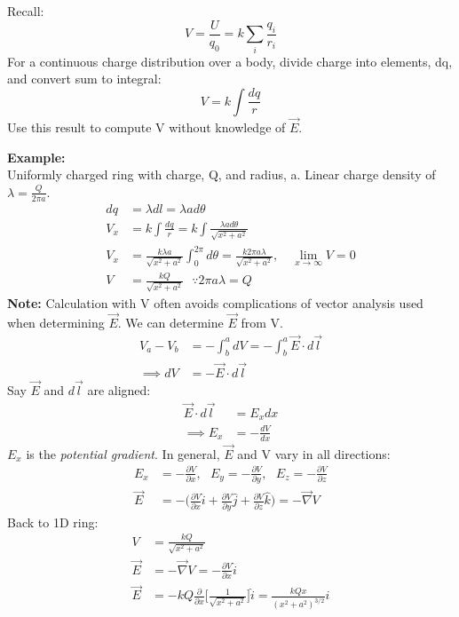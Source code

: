 \documentclass[a4paper, 11pt, normalem]{report}
\begin{document}
\chapter{}
Recall:
\begin{equation}
    V = \frac{U}{q_{0}} = k \sum_{i} \frac{q_{i}}{r_{i}}
\end{equation}
For a continuous charge distribution over a body, divide charge into elements, dq, and convert sum to integral:
\begin{equation}
    V = k \int \frac{dq}{r}
\end{equation}
Use this result to compute V without knowledge of $\vec{E}$.

\textbf{Example:}\\
Uniformly charged ring with charge, Q, and radius, a.
Linear charge density of $\lambda = \frac{Q}{2\pi a}$.
\begin{align}
    dq &= \lambda dl = \lambda a d\theta \\
    V_{x} &= k \int \frac{dq}{r} = k \int \frac{\lambda a d\theta}{\sqrt{x^{2} + a^{2}}} \\
    V_{x} &= \frac{k\lambda a}{\sqrt{x^{2} + a^{2}}} \int_{0}^{2\pi} d\theta = \frac{k2\pi a \lambda}{\sqrt{x^{2} + a^{2}}},\quad \lim_{x \to \infty} V = 0 \\
    V &= \frac{kQ}{\sqrt{x^{2} + a^{2}}} ~~~ \because 2\pi a \lambda = Q
\end{align}
\textbf{Note:} Calculation with V often avoids complications of vector analysis used when determining $\vec{E}$. We can determine $\vec{E}$ from V.
\begin{align}
    V_{a} - V_{b} &= - \int_{b}^{a} dV = - \int_{b}^{a} \vec{E} \cdot d\vec{l} \\
    \implies dV &= - \vec{E} \cdot d\vec{l}
\end{align}
Say $\vec{E}$ and $d\vec{l}$ are aligned:
\begin{align}
    \vec{E} \cdot d\vec{l} &= E_{x}dx \\
    \implies E_{x} &= - \frac{dV}{dx}
\end{align}
$E_{x}$ is the \emph{potential gradient}.
In general, $\vec{E}$ and V vary in all directions:
\begin{align}
    E_{x} &= - \frac{\partial V}{\partial x}, ~~~ E_{y} = - \frac{\partial V}{\partial y}, ~~~ E_{z} = - \frac{\partial V}{\partial z} \\
    \vec{E} &= - \Bigg(\frac{\partial V}{\partial x} \hat{i} + \frac{\partial V}{\partial y} \hat{j} + \frac{\partial V}{\partial z} \hat{k} \Bigg) = - \vec{\nabla} V
\end{align}
Back to 1D ring:
\begin{align}
    V &= \frac{kQ}{\sqrt{x^{2} + a^{2}}} \\
    \vec{E} &= -\vec{\nabla}V = - \frac{\partial V}{\partial x} \hat{i} \\
    \vec{E} &= -kQ \frac{\partial}{\partial x} \Bigg[\frac{1}{\sqrt{x^{2} + a^{2}}} \Bigg] \hat{i} = \frac{kQx}{(x^{2} + a^{2})^{3/2}} \hat{i}
\end{align}
\end{document}
